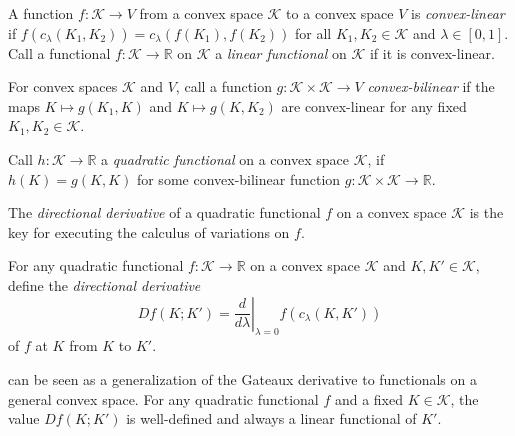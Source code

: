 \begin{definition}

A function \(f : \mathcal{K} \to V\) from a convex space \(\mathcal{K}\) to a convex space \(V\) is \emph{convex-linear} if \(f(c_\lambda(K_1, K_2)) = c_\lambda(f(K_1), f(K_2))\) for all \(K_1, K_2 \in \mathcal{K}\) and \(\lambda \in [0, 1]\). Call a functional \(f : \mathcal{K} \to \mathbb{R}\) on \(\mathcal{K}\) a \emph{linear functional} on \(\mathcal{K}\) if it is convex-linear.

\label{def:convex-linear}
\end{definition}

\begin{definition}

For convex spaces \(\mathcal{K}\) and \(V\), call a function \(g : \mathcal{K} \times \mathcal{K} \to V\) \emph{convex-bilinear} if the maps \(K \mapsto g(K_1, K)\) and \(K \mapsto g(K, K_2)\) are convex-linear for any fixed \(K_1, K_2 \in \mathcal{K}\).

\label{def:convex-bilinear}
\end{definition}

\begin{definition}

Call \(h : \mathcal{K} \to \mathbb{R}\) a \emph{quadratic functional} on a convex space \(\mathcal{K}\), if \(h(K) = g(K, K)\) for some convex-bilinear function \(g : \mathcal{K} \times \mathcal{K} \to \mathbb{R}\).

\label{def:convex-space-quadratic}
\end{definition}

The \emph{directional derivative} of a quadratic functional \(f\) on a convex space \(\mathcal{K}\) is the key for executing the calculus of variations on \(f\).

\begin{definition}

For any quadratic functional \(f : \mathcal{K} \to \mathbb{R}\) on a convex space \(\mathcal{K}\) and \(K, K' \in \mathcal{K}\), define the \emph{directional derivative}
\[
Df(K; K') = \left. \frac{d}{d \lambda} \right|_{\lambda = 0} f(c_\lambda(K, K'))
\]
of \(f\) at \(K\) from \(K\) to \(K'\).

\label{def:convex-space-directional-derivative}
\end{definition}

 can be seen as a generalization of the Gateaux derivative to functionals on a general convex space. For any quadratic functional \(f\) and a fixed \(K \in \mathcal{K}\), the value \(Df(K; K')\) is well-defined and always a linear functional of \(K'\).

